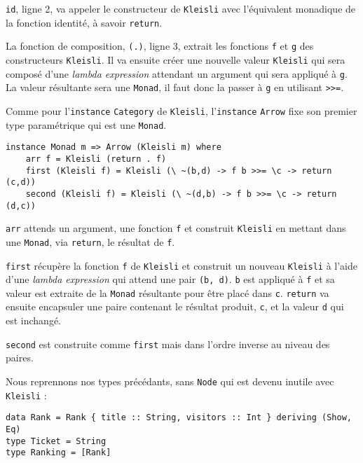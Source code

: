 \documentclass{llncs}
\begin{document}
\lstinline{id}, ligne 2, va appeler le constructeur de \lstinline{Kleisli} avec
l'équivalent monadique de la fonction identité, à savoir \lstinline{return}.

La fonction de composition, \lstinline{(.)}, ligne 3, extrait les fonctions
\lstinline{f} et \lstinline{g} des constructeurs \lstinline{Kleisli}.
Il va ensuite créer une nouvelle valeur \lstinline{Kleisli} qui sera composé d'une
\emph{lambda expression} attendant un argument qui sera appliqué à \lstinline{g}.
La valeur résultante sera une \lstinline{Monad}, il faut donc la passer à \lstinline{g}
en utilisant \lstinline{>>=}.

Comme pour l'\lstinline{instance} \lstinline{Category} de \lstinline{Kleisli},
l'\lstinline{instance} \lstinline{Arrow} fixe son premier type paramétrique qui
est une \lstinline{Monad}.
\begin{lstlisting}
instance Monad m => Arrow (Kleisli m) where
    arr f = Kleisli (return . f)
    first (Kleisli f) = Kleisli (\ ~(b,d) -> f b >>= \c -> return (c,d))
    second (Kleisli f) = Kleisli (\ ~(d,b) -> f b >>= \c -> return (d,c))
\end{lstlisting}
\lstinline{arr} attends un argument, une fonction \lstinline{f} et construit
\lstinline{Kleisli} en mettant dans une \lstinline{Monad}, via \lstinline{return},
le résultat de \lstinline{f}.

\lstinline{first} récupère la fonction \lstinline{f} de \lstinline{Kleisli} et
construit un nouveau \lstinline{Kleisli} à l'aide d'une \emph{lambda expression}
qui attend une pair \lstinline{(b, d)}.
\lstinline{b} est appliqué à \lstinline{f} et sa valeur est extraite de la
\lstinline{Monad} résultante pour être placé dans \lstinline{c}.
\lstinline{return} va ensuite encapsuler une paire contenant le résultat produit,
\lstinline{c}, et la valeur \lstinline{d} qui est inchangé.

\lstinline{second} est construite comme \lstinline{first} mais dans l'ordre inverse
au niveau des paires.

Nous reprennons nos types précédants, sans \lstinline{Node} qui est devenu
inutile avec \lstinline{Kleisli} :
\begin{lstlisting}
data Rank = Rank { title :: String, visitors :: Int } deriving (Show, Eq)
type Ticket = String
type Ranking = [Rank]
\end{lstlisting}
\end{document}
